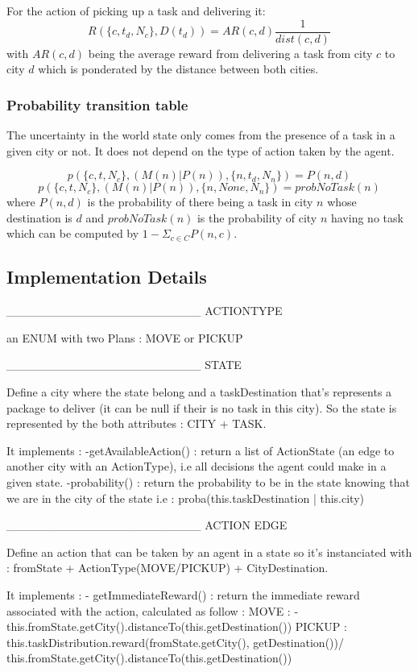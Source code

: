\documentclass[11pt]{article}
\begin{document}
For the action of picking up a task and delivering it:
$$R(\{c, t_d, N_c\}, D(t_d)) = AR(c, d) \frac{1}{dist(c, d)}$$
with $AR(c, d)$ being the average reward from delivering a task from city
$c$ to city $d$ which is ponderated by the distance between both cities.

\subsubsection{Probability transition table}
The uncertainty in the world state only comes from the presence of a task in a
given city or not. It does not depend on the type of action taken by the agent.

$$ p(\{c, t, N_c\}, (M(n)|P(n)), \{n, t_d, N_n\}) = P(n,d)$$
$$ p(\{c, t, N_c\}, (M(n)|P(n)), \{n, None, N_n\}) = probNoTask(n)$$
where $P(n,d)$ is the probability of there being a task in city $n$ whose
destination is $d$ and $probNoTask(n)$ is the probability of city $n$ having no
task which can be computed by $1 - \Sigma_{c \in C} P(n, c)$.

\subsection{Implementation Details}

_______________________ ACTIONTYPE

an ENUM with two Plans : MOVE or PICKUP

_______________________ STATE

Define a city where the state belong and a taskDestination that's represents
a package to deliver (it can be null if their is no task in this city).
So the state is represented by the both attributes : CITY + TASK.

It implements :
-getAvailableAction() : return a list of ActionState (an edge to another city with an ActionType),
i.e all decisions the agent could make in a given state.
-probability() : return the probability to be in the state knowing that we are in the city of the state
i.e : proba(this.taskDestination | this.city)


_______________________ ACTION EDGE

Define an action that can be taken by an agent in a state so it's instanciated with :
fromState + ActionType(MOVE/PICKUP) + CityDestination.

It implements :
- getImmediateReward() : return the immediate reward associated with the action, calculated as follow :
MOVE : -this.fromState.getCity().distanceTo(this.getDestination())
PICKUP : this.taskDistribution.reward(fromState.getCity(), getDestination())/ this.fromState.getCity().distanceTo(this.getDestination())
\end{document}

